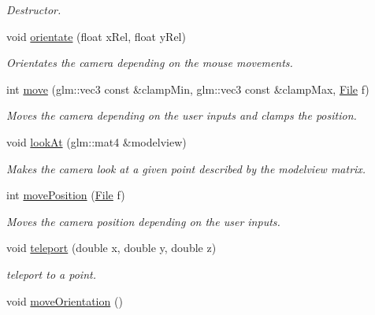 \begin{DoxyCompactItemize}
\begin{DoxyCompactList}\small\item\em Destructor. \end{DoxyCompactList}\item 
void \hyperlink{classCamera_af9647ba1a19c27928b56630a3164d54e}{orientate} (float x\+Rel, float y\+Rel)
\begin{DoxyCompactList}\small\item\em Orientates the camera depending on the mouse movements. \end{DoxyCompactList}\item 
int \hyperlink{classCamera_a631854f3063e6ddf8f7c2697c34c2bc0}{move} (glm\+::vec3 const \&clamp\+Min, glm\+::vec3 const \&clamp\+Max, \hyperlink{classFile}{File} f)
\begin{DoxyCompactList}\small\item\em Moves the camera depending on the user inputs and clamps the position. \end{DoxyCompactList}\item 
void \hyperlink{classCamera_ac086b3a16c50dfd4accfc3a76b1db719}{look\+At} (glm\+::mat4 \&modelview)
\begin{DoxyCompactList}\small\item\em Makes the camera look at a given point described by the modelview matrix. \end{DoxyCompactList}\item 
\hypertarget{classCamera_aee126011d76a1f867c35ad2fa54e73d7}{}int \hyperlink{classCamera_aee126011d76a1f867c35ad2fa54e73d7}{move\+Position} (\hyperlink{classFile}{File} f)\label{classCamera_aee126011d76a1f867c35ad2fa54e73d7}

\begin{DoxyCompactList}\small\item\em Moves the camera position depending on the user inputs. \end{DoxyCompactList}\item 
void \hyperlink{classCamera_a0dc77df7121855934ca107be392c9bd7}{teleport} (double x, double y, double z)
\begin{DoxyCompactList}\small\item\em teleport to a point. \end{DoxyCompactList}\item 
\hypertarget{classCamera_a856ab6b929b48aca124e05f4c4cf32fd}{}void \hyperlink{classCamera_a856ab6b929b48aca124e05f4c4cf32fd}{move\+Orientation} ()\label{classCamera_a856ab6b929b48aca124e05f4c4cf32fd}


\end{DoxyCompactItemize}
